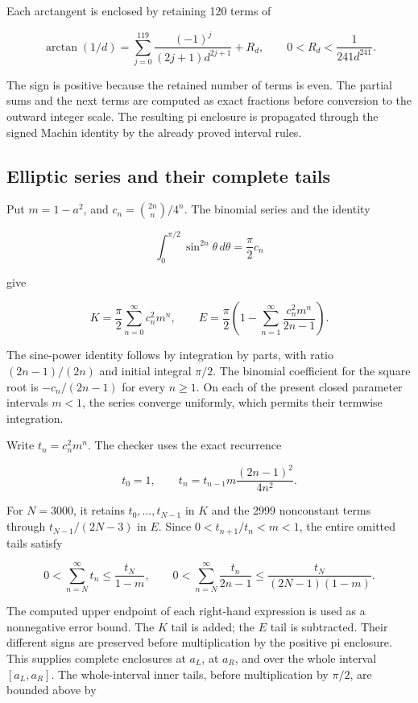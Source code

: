 \documentclass[11pt,a4paper]{article}
\begin{document}
Each arctangent is enclosed by retaining 120 terms of

\[
 \arctan(1/d)=\sum_{j=0}^{119}
       \frac{(-1)^j}{(2j+1)d^{2j+1}}+R_d,
 \qquad
 0<R_d<\frac1{241d^{241}}.
\]

The sign is positive because the retained number of terms is even. The partial sums and the next terms are computed as exact fractions before conversion to the outward integer scale. The resulting pi enclosure is propagated through the signed Machin identity by the already proved interval rules.

\subsection{Elliptic series and their complete tails}

Put $m=1-a^2$, and $c_n=\binom{2n}{n}/4^n$. The binomial series and the identity

\[
 \int_0^{\pi/2}\sin^{2n}\theta\,d\theta
 =\frac\pi2 c_n
\]

give

\[
 K=\frac\pi2\sum_{n=0}^{\infty}c_n^2m^n,
 \qquad
 E=\frac\pi2\left(1-\sum_{n=1}^{\infty}
                   \frac{c_n^2m^n}{2n-1}\right).
\]

The sine-power identity follows by integration by parts, with ratio $(2n-1)/(2n)$ and initial integral $\pi/2$. The binomial coefficient for the square root is $-c_n/(2n-1)$ for every $n\ge1$. On each of the present closed parameter intervals $m<1$, the series converge uniformly, which permits their termwise integration.

Write $t_n=c_n^2m^n$. The checker uses the exact recurrence

\[
 t_0=1,\qquad
 t_n=t_{n-1}m\frac{(2n-1)^2}{4n^2}.
\]

For $N=3000$, it retains $t_0,\ldots,t_{N-1}$ in $K$ and the 2999 nonconstant terms through $t_{N-1}/(2N-3)$ in $E$. Since $0<t_{n+1}/t_n<m<1$, the entire omitted tails satisfy

\[
 0<\sum_{n=N}^{\infty}t_n\le\frac{t_N}{1-m},\qquad
 0<\sum_{n=N}^{\infty}\frac{t_n}{2n-1}
 \le\frac{t_N}{(2N-1)(1-m)}.
\]

The computed upper endpoint of each right-hand expression is used as a nonnegative error bound. The $K$ tail is added; the $E$ tail is subtracted. Their different signs are preserved before multiplication by the positive pi enclosure. This supplies complete enclosures at $a_L$, at $a_R$, and over the whole interval $[a_L,a_R]$. The whole-interval inner tails, before multiplication by $\pi/2$, are bounded above by
\end{document}

